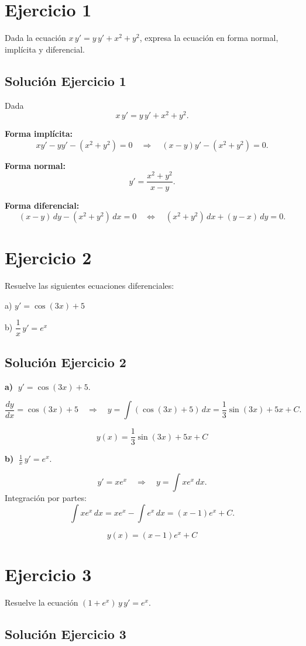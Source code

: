 \documentclass[12pt]{article}
\begin{document}
\section*{Ejercicio 1}
Dada la ecuación $x\,y' = y\,y' + x^2 + y^2$, expresa la ecuación en forma normal, implícita y diferencial.

\subsection*{Solución Ejercicio 1}

Dada
\[
x\,y' = y\,y' + x^2 + y^2.
\]

\textbf{Forma implícita:}
\[
xy' - yy' - (x^2+y^2)=0
\quad\Rightarrow\quad
(x-y)y'-(x^2+y^2)=0.
\]

\textbf{Forma normal:}
\[
y'=\frac{x^2+y^2}{x-y}.
\]

\textbf{Forma diferencial:}
\[
(x-y)\,dy-(x^2+y^2)\,dx=0
\quad\Leftrightarrow\quad
(x^2+y^2)\,dx+(y-x)\,dy=0.
\]
\section*{Ejercicio 2}
Resuelve las siguientes ecuaciones diferenciales:

a) $y' = \cos(3x) + 5$

b) $\dfrac{1}{x}\,y' = e^x$

\subsection*{Solución Ejercicio 2}

\textbf{a)} \(\;y'=\cos(3x)+5\).

\[
\frac{dy}{dx}=\cos(3x)+5
\quad\Rightarrow\quad
y=\int(\cos(3x)+5)\,dx
=\frac{1}{3}\sin(3x)+5x+C.
\]

\[
\boxed{\,y(x)=\frac{1}{3}\sin(3x)+5x+C\,}
\]

\textbf{b)} \(\;\frac1x\,y'=e^x\).

\[
y'=x e^x
\quad\Rightarrow\quad
y=\int x e^x\,dx.
\]
Integración por partes:
\[
\int x e^x\,dx = x e^x-\int e^x\,dx=(x-1)e^x+C.
\]

\[
\boxed{\,y(x)=(x-1)e^x+C\,}
\]

\section*{Ejercicio 3}
Resuelve la ecuación $(1 + e^x)\,y\,y' = e^x$.

\subsection*{Solución Ejercicio 3}
\end{document}
